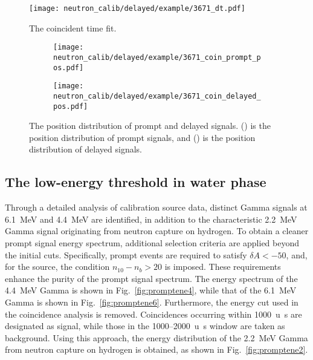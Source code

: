 \begin{figure}[htbp]
	\centering
	\texttt{[image: neutron\_calib/delayed/example/3671\_dt.pdf]}
	\caption{The coincident time fit.}
	\label{fig:delayFit}
\end{figure}

\begin{figure}[htbp]
	\centering
	\begin{subfigure}{0.5\textwidth}
		\centering
		\texttt{[image: neutron\_calib/delayed/example/3671\_coin\_prompt\_pos.pdf]}
		\caption{}
		\label{fig:promptpos}
	\end{subfigure}%
	\begin{subfigure}{0.5\textwidth}
		\centering
		\texttt{[image: neutron\_calib/delayed/example/3671\_coin\_delayed\_pos.pdf]}
		\caption{}
		\label{fig:delayedpos}
	\end{subfigure}
	\caption{The position distribution of prompt and delayed signals.  () is the position distribution of prompt signals, and () is the position distribution of delayed signals.}
	\label{fig:coincidentPos}
\end{figure}

\subsection{The low-energy threshold in water phase}
Through a detailed analysis of calibration source data, distinct Gamma signals at \SI{6.1}{\MeV} and \SI{4.4}{\MeV} are identified, in addition to the characteristic \SI{2.2}{\MeV} Gamma signal originating from neutron capture on hydrogen.
To obtain a cleaner prompt signal energy spectrum, additional selection criteria are applied beyond the initial cuts.
Specifically, prompt events are required to satisfy $\delta A < -50$, and, for the  source, the condition $n_{10} - n_{b} > 20$ is imposed.
These requirements enhance the purity of the prompt signal spectrum.
The energy spectrum of the \SI{4.4}{\MeV} Gamma is shown in Fig.~\ref{fig:promptene4}, while that of the \SI{6.1}{\MeV} Gamma is shown in Fig.~\ref{fig:promptene6}.
Furthermore, the energy cut used in the coincidence analysis is removed.
Coincidences occurring within \SI{1000}{u\second} are designated as signal, while those in the 1000--\SI{2000}{u\second} window are taken as background.
Using this approach, the energy distribution of the \SI{2.2}{\MeV} Gamma from neutron capture on hydrogen is obtained, as shown in Fig.~\ref{fig:promptene2}.

